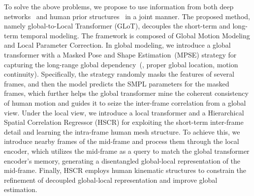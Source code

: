 \documentclass[10pt,twocolumn,letterpaper]{article}
\begin{document}
To solve the above problems, we propose to use information from both deep networks~\cite{Transformer} and human prior structures~\cite{SMPL, ZiniuWan2021EncoderDecoderWM} in a joint manner. The proposed method, namely global-to-Local Transformer (GLoT), decouples the short-term and long-term temporal modeling.
        The framework is composed of Global Motion Modeling and Local Parameter Correction. 
	In global modeling, we introduce a global transformer with a Masked Pose and Shape Estimation~(MPSE) strategy for capturing the long-range global dependency~(\eg, proper global location, motion continuity). Specifically, the strategy randomly masks the features of several frames, and then the model predicts the SMPL parameters for the masked frames, which further helps the global transformer mine the coherent consistency of human motion and guides it to seize the inter-frame correlation from a global view. 
	Under the local view, we introduce a local transformer and a Hierarchical Spatial Correlation Regressor (HSCR) for exploiting the short-term inter-frame detail and learning the intra-frame human mesh structure. 
To achieve this, we introduce nearby frames of the mid-frame and process them through the local encoder, which utilizes the mid-frame as a query to match the global transformer encoder’s memory, generating a disentangled global-local representation of the mid-frame.
Finally, HSCR employs human kinematic structures to constrain the refinement of decoupled global-local representation and improve global estimation.
	
\end{document}
